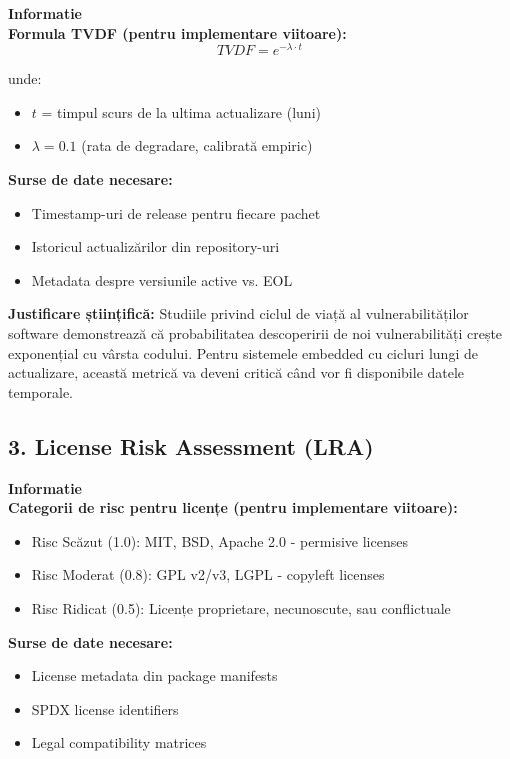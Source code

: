 \documentclass[12pt,a4paper]{article}
\newenvironment{infobox}{%
\begin{leftbar}
\color{black}
\textbf{Informatie}\\[0.5em]
}{%
\end{leftbar}
}
\begin{document}
\begin{infobox}
\textbf{Formula TVDF (pentru implementare viitoare):}
\[TVDF = e^{-\lambda \cdot t}\]

unde:
\begin{itemize}
\item $t$ = timpul scurs de la ultima actualizare (luni)
\item $\lambda = 0.1$ (rata de degradare, calibrată empiric)
\end{itemize}

\textbf{Surse de date necesare:}
\begin{itemize}
\item Timestamp-uri de release pentru fiecare pachet
\item Istoricul actualizărilor din repository-uri
\item Metadata despre versiunile active vs. EOL
\end{itemize}
\end{infobox}

\textbf{Justificare științifică:} Studiile privind ciclul de viață al vulnerabilităților software demonstrează că probabilitatea descoperirii de noi vulnerabilități crește exponențial cu vârsta codului. Pentru sistemele embedded cu cicluri lungi de actualizare, această metrică va deveni critică când vor fi disponibile datele temporale.

\subsection{3. License Risk Assessment (LRA)}

\begin{infobox}
\textbf{Categorii de risc pentru licențe (pentru implementare viitoare):}
\begin{itemize}
\item Risc Scăzut (1.0): MIT, BSD, Apache 2.0 - permisive licenses
\item Risc Moderat (0.8): GPL v2/v3, LGPL - copyleft licenses
\item Risc Ridicat (0.5): Licențe proprietare, necunoscute, sau conflictuale
\end{itemize}

\textbf{Surse de date necesare:}
\begin{itemize}
\item License metadata din package manifests
\item SPDX license identifiers
\item Legal compatibility matrices
\end{itemize}
\end{infobox}
\end{document}
